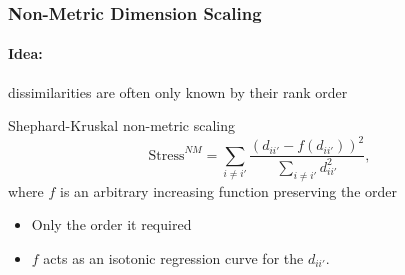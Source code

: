 \documentclass{beamer}\usepackage[]{graphicx}\usepackage[]{color}
\begin{document}
\begin{frame}
  \frametitle{Non-Metric Dimension Scaling}
  
  \paragraph{Idea:} dissimilarities are often only known by their rank order

  \begin{block}{Shephard-Kruskal non-metric scaling}
      \begin{equation*}
        \text{Stress}^{NM} = \sum_{i\neq i'} \frac{\left(d_{ii'} - f(d_{ii'}) \right)^2}{\sum_{i\neq i'} d_{ii'}^2},
      \end{equation*}
      where $f$ is an arbitrary increasing function preserving the order
      
      \bigskip
      
      \begin{itemize}
        \item[\rsa] Only the order it required
        \item[\rsa] $f$ acts as an isotonic regression curve for the $d_{ii'}$. 
      \end{itemize}
  \end{block}

\end{frame}
\end{document}
